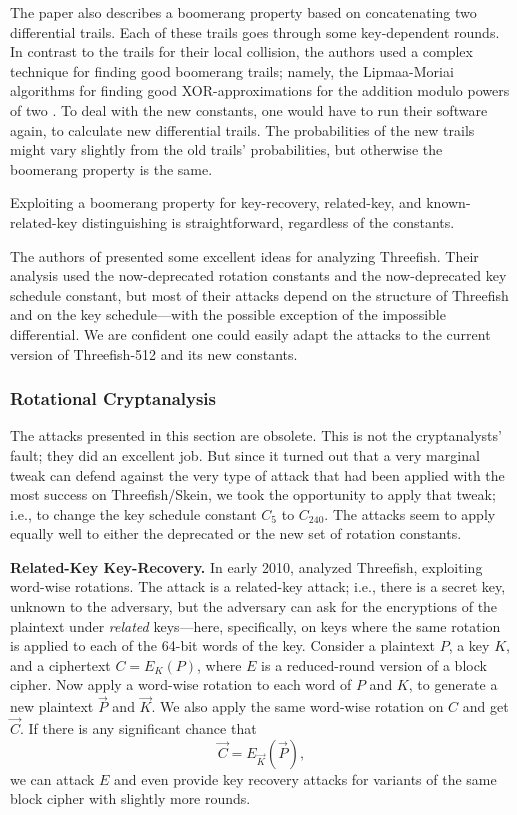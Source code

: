 \documentclass[11pt,twoside]{article}
\newcommand{\TheConst}{C_{240}} %
\begin{document}
The paper also describes a boomerang property based on concatenating two differential trails. Each of these trails goes through some key-dependent rounds. In contrast to the trails for their local collision, the authors used a complex technique for finding good boomerang trails; namely, the Lipmaa-Moriai algorithms for finding good XOR-approximations for the addition modulo powers of two \cite{LiMo}. To deal with the new constants, one would have to run their software again, to calculate new differential trails. The probabilities of the new trails might vary slightly from the old trails' probabilities, but otherwise the boomerang property is the same. 

Exploiting a boomerang property for key-recovery, related-key, and known-related-key distinguishing is straightforward, regardless of the constants. 

The authors of \cite{ACMOPV09} presented some excellent ideas for analyzing
Threefish. Their analysis used the now-deprecated rotation constants and the
now-deprecated key schedule constant, but most of their attacks depend on the
structure of Threefish and on the key schedule---with the possible exception
of the impossible differential. We are confident one could easily adapt the
attacks to the current version of Threefish-512 and its new constants.

\subsubsection{Rotational Cryptanalysis}

The attacks presented in this section are obsolete. This is not the
cryptanalysts' fault; they did an excellent job. But since it turned
out that a very marginal tweak can defend against the very type of
attack that had been applied with the most success on Threefish/Skein, we
took the opportunity to apply that tweak; i.e., to change the key schedule
constant $C_5$ to $\TheConst$. The attacks seem to apply equally
well to either the deprecated or the new set of rotation constants. 

\medskip

{\bf Related-Key Key-Recovery.}
In early 2010, \cite{KN10} analyzed Threefish,
exploiting word-wise rotations. The attack is a related-key attack; i.e., there
is a secret key, unknown to the adversary, but the adversary can ask for the
encryptions of the plaintext under \emph{related} keys---here, specifically,
on keys where the same rotation is applied to each of the 64-bit words of the
key. 
%
Consider a plaintext
$P$, a key $K$, and a ciphertext $C=E_K(P)$, where $E$ is a reduced-round
version of a block cipher. Now apply a word-wise rotation to
each word of $P$ and $K$, to generate a new plaintext $\vec{P}$ and
$\vec{K}$. We also apply the same word-wise rotation on $C$ and get
$\vec{C}$. If there is any significant chance that 
   \begin{equation}\label{eq:rotational} 
     \vec{C} = E_{\vec{K}}(\vec{P}),
   \end{equation}
we can attack $E$ and even provide key recovery attacks for variants of the
same block cipher with slightly more rounds. 
\end{document}
